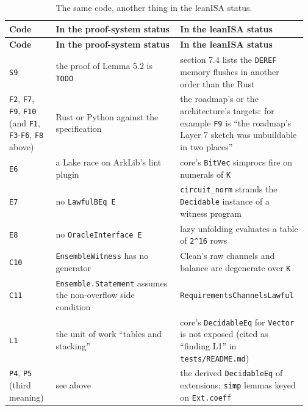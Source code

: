 {\footnotesize\setlength{\tabcolsep}{3pt}
\begin{longtable}{@{}>{\raggedright\arraybackslash}p{0.155\linewidth}>{\raggedright\arraybackslash}p{0.407\linewidth}>{\raggedright\arraybackslash}p{0.407\linewidth}@{}}
\caption{The same code, another thing in the leanISA status.}\label{tab:docs-code-collisions-leanisa}\\
\toprule
\textbf{Code} & \textbf{In the proof-system status} & \textbf{In the leanISA status} \\
\midrule
\endfirsthead
\toprule
\textbf{Code} & \textbf{In the proof-system status} & \textbf{In the leanISA status} \\
\midrule
\endhead
\bottomrule
\endfoot
\texttt{S9} & the proof of Lemma 5.2 is \texttt{TODO} & section 7.4 lists the \texttt{DEREF} memory flushes in another order than the Rust \\\addlinespace[2pt]
\texttt{F2}, \texttt{F7}, \texttt{F9}, \texttt{F10} (and \texttt{F1}, \texttt{F3}-\texttt{F6}, \texttt{F8} above) & Rust or Python against the specification & the roadmap's or the architecture's targets: for example \texttt{F9} is ``the roadmap's Layer 7 sketch was unbuildable in two places'' \\\addlinespace[2pt]
\texttt{E6} & a Lake race on ArkLib's lint plugin & core's \texttt{BitVec} simprocs fire on numerals of \texttt{K} \\\addlinespace[2pt]
\texttt{E7} & no \texttt{LawfulBEq E} & \texttt{circuit\_\allowbreak{}norm} strands the \texttt{Decidable} instance of a witness program \\\addlinespace[2pt]
\texttt{E8} & no \texttt{Oracle\allowbreak{}Interface E} & lazy unfolding evaluates a table of \texttt{2\textasciicircum{}16} rows \\\addlinespace[2pt]
\texttt{C10} & \texttt{Ensemble\allowbreak{}Witness} has no generator & Clean's raw channels and balance are degenerate over \texttt{K} \\\addlinespace[2pt]
\texttt{C11} & \texttt{Ensemble.\allowbreak{}Statement} assumes the non-overflow side condition & \texttt{Requirements\allowbreak{}Channels\allowbreak{}Lawful} \\\addlinespace[2pt]
\texttt{L1} & the unit of work ``tables and stacking'' & core's \texttt{DecidableEq} for \texttt{Vector} is not exposed (cited as ``finding L1'' in \texttt{tests/\allowbreak{}README.\allowbreak{}md}) \\\addlinespace[2pt]
\texttt{P4}, \texttt{P5} (third meaning) & see above & the derived \texttt{DecidableEq} of extensions; \texttt{simp} lemmas keyed on \texttt{Ext.\allowbreak{}coeff} \\
\end{longtable}}

